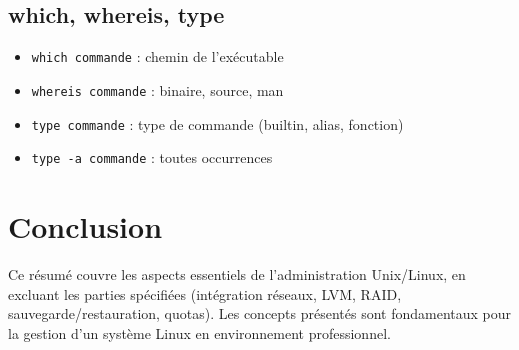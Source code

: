 \documentclass[12pt,a4paper]{article}
\begin{document}
\subsection{which, whereis, type}
\begin{itemize}
    \item \texttt{which commande} : chemin de l'ex\'ecutable %
    \item \texttt{whereis commande} : binaire, source, man %
    \item \texttt{type commande} : type de commande (builtin, alias, fonction) %
    \item \texttt{type -a commande} : toutes occurrences %
\end{itemize}


\section*{Conclusion}

Ce r\'esum\'e couvre les aspects essentiels de l'administration Unix/Linux, en excluant les parties sp\'ecifi\'ees (int\'egration r\'eseaux, LVM, RAID, sauvegarde/restauration, quotas). Les concepts pr\'esent\'es sont fondamentaux pour la gestion d'un syst\`eme Linux en environnement professionnel.
\end{document}
